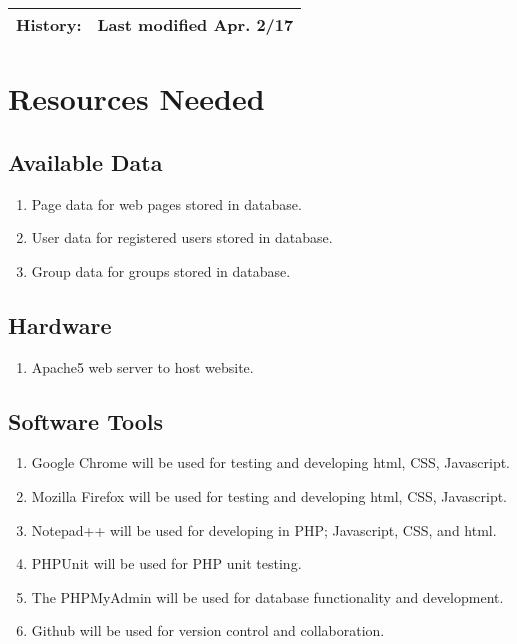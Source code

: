 \documentclass[11pt]{article}
\begin{document}
\begin{table}[H]
\begin{tabular}{|l|l|l|l|l|l|}
History:                                                          & \multicolumn{5}{l|}{Last modified Apr. 2/17}                                                                                                                                        \\ \hline
\end{tabular}
\end{table}


\section{Resources Needed}

\subsection{Available Data}

\begin{enumerate}
  \item Page data for web pages stored in database.
  \item User data for registered users stored in database.
  \item Group data for groups stored in database.
\end{enumerate}

\subsection{Hardware}

\begin{enumerate}
  \item Apache5 web server to host website.
\end{enumerate}



\subsection{Software Tools }

\begin{enumerate}
  \item Google Chrome will be used for testing and developing html, CSS, Javascript.
  \item Mozilla Firefox will be used for testing and developing html, CSS, Javascript.
  \item Notepad++ will be used for developing in PHP; Javascript, CSS, and html.
  \item PHPUnit will be used for PHP unit testing.
  \item The PHPMyAdmin will be used for database functionality and development.
  \item Github will be used for version control and collaboration.
\end{enumerate}
\end{document}
